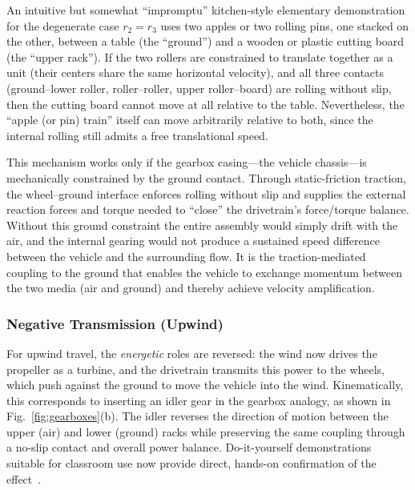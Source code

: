 \documentclass[reprint,aps,pra,longbibliography]{revtex4-2}
\begin{document}
An intuitive but somewhat ``impromptu'' kitchen-style elementary demonstration for the degenerate case $r_2 = r_3$ uses two apples or two rolling pins, one stacked on the other, between a table (the ``ground'') and a wooden or plastic cutting board (the ``upper rack'').
If the two rollers are constrained to translate together as a unit (their centers share the same horizontal velocity), and all three contacts (ground--lower roller, roller--roller, upper roller--board) are rolling without slip, then the cutting board cannot move at all relative to the table. Nevertheless, the ``apple (or pin) train'' itself can move arbitrarily relative to both, since the internal rolling still admits a free translational speed.




This mechanism works only if the gearbox casing---the vehicle chassis---is mechanically constrained by the ground contact. Through static-friction traction, the wheel--ground interface enforces rolling without slip and supplies the external reaction forces and torque needed to ``close'' the drivetrain's force/torque balance. Without this ground constraint the entire assembly would simply drift with the air, and the internal gearing would not produce a sustained speed difference between the vehicle and the surrounding flow. It is the traction-mediated coupling to the ground that enables the vehicle to exchange momentum between the two media (air and ground) and thereby achieve velocity amplification.


\subsubsection{Negative Transmission (Upwind)}

For upwind travel, the \emph{energetic} roles are reversed: the wind now drives
the propeller as a turbine, and the drivetrain transmits this power to the
wheels, which push against the ground to move the vehicle into the wind.
Kinematically, this corresponds to inserting an idler gear in the gearbox
analogy, as shown in Fig.~\ref{fig:gearboxes}(b). The idler reverses the
direction of motion between the upper (air) and lower (ground) racks while
preserving the same coupling through a no-slip contact and overall power balance.
Do-it-yourself demonstrations suitable for classroom use now provide direct, hands-on confirmation of the effect~\cite{Foxlin2021DWFTTW}.
\end{document}
